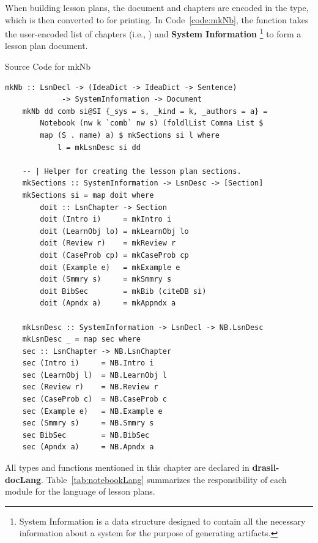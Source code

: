 When building lesson plans, the document and chapters are encoded in the 
 type, which is then converted to  for 
printing. In Code~\ref{code:mkNb}, the  function takes the 
user-encoded list of chapters (i.e., ) and \textbf{System 
Information} \footnote{System Information is a data structure designed to 
contain all the necessary information about a system for the purpose of 
generating artifacts.} to form a lesson plan document.

\begin{listing}[h!]
	\caption{Source Code for mkNb}
	\label{code:mkNb}
	\begin{lstlisting}[language=haskell1]
	mkNb :: LsnDecl -> (IdeaDict -> IdeaDict -> Sentence) 
			 -> SystemInformation -> Document
	mkNb dd comb si@SI {_sys = s, _kind = k, _authors = a} =
		Notebook (nw k `comb` nw s) (foldlList Comma List $ 
		map (S . name) a) $	mkSections si l where
			l = mkLsnDesc si dd
	
	-- | Helper for creating the lesson plan sections.
	mkSections :: SystemInformation -> LsnDesc -> [Section]
	mkSections si = map doit where
		doit :: LsnChapter -> Section
		doit (Intro i)     = mkIntro i
		doit (LearnObj lo) = mkLearnObj lo
		doit (Review r)    = mkReview r
		doit (CaseProb cp) = mkCaseProb cp
		doit (Example e)   = mkExample e
		doit (Smmry s)     = mkSmmry s
		doit BibSec        = mkBib (citeDB si)
		doit (Apndx a)     = mkAppndx a
	
	mkLsnDesc :: SystemInformation -> LsnDecl -> NB.LsnDesc
	mkLsnDesc _ = map sec where
	sec :: LsnChapter -> NB.LsnChapter
	sec (Intro i)     = NB.Intro i
	sec (LearnObj l)  = NB.LearnObj l
	sec (Review r)    = NB.Review r  
	sec (CaseProb c)  = NB.CaseProb c
	sec (Example e)   = NB.Example e  
	sec (Smmry s)     = NB.Smmry s
	sec BibSec        = NB.BibSec
	sec (Apndx a)     = NB.Apndx a
	\end{lstlisting}
\end{listing}

All types and functions mentioned in this chapter are declared in 
\textbf{drasil-docLang}. Table~\ref{tab:notebookLang} summarizes the 
responsibility of each module for the language of lesson plans.

